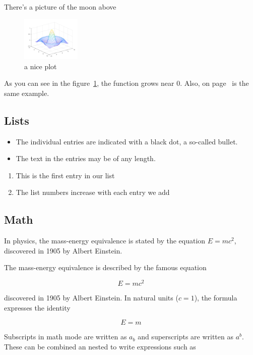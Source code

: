 \documentclass[12pt, letterpaper]{article}
\begin{document}
There's a picture of the moon above

\begin{figure}[h]
    \centering
    \includegraphics[width=0.25\textwidth]{mesh}
    \caption{a nice plot}
    \label{fig:mesh1}
\end{figure}

As you can see in the figure~\ref{fig:mesh1}, the
function grows near 0. Also, on page~\pageref{fig:mesh1}
is the same example.

\subsection{Lists}

\begin{itemize}
    \item The individual entries are indicated with a black dot, a so-called bullet.
    \item The text in the entries may be of any length.
\end{itemize}

\begin{enumerate}
    \item This is the first entry in our list
    \item The list numbers increase with each entry we add
\end{enumerate}

\subsection{Math}

In physics, the mass-energy equivalence is stated
by the equation $E=mc^2$, discovered in 1905 by Albert Einstein.

The mass-energy equivalence is described by the famous equation

\[E=mc^2\]

discovered in 1905 by Albert Einstein.
In natural units ($c = 1$), the formula expresses the identity

\begin{equation}
E=m
\end{equation}

Subscripts in math mode are written as $a_b$ and superscripts are written as $a^b$. These can be combined an nested to write expressions such as
\end{document}
